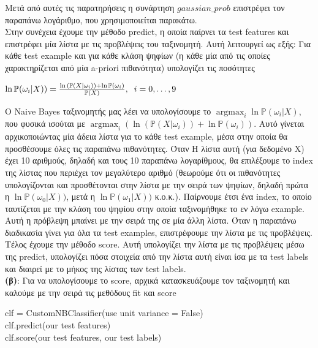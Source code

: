\documentclass[11pt]{article} %
\begin{document}
Μετά από αυτές τις παρατηρήσεις η συνάρτηση $gaussian\_prob$ επιστρέφει τον παραπάνω λογάριθμο, που χρησιμοποιείται παρακάτω.\\


Στην συνέχεια έχουμε την μέθοδο predict, η οποία παίρνει τα test features και επιστρέφει μία λίστα με τις προβλέψεις του ταξινομητή. Αυτή λειτουργεί ως εξής: Για κάθε test example και για κάθε κλάση ψηφίων (η κάθε μία από τις οποίες χαρακτηρίζεται από μία a-priori πιθανότητα) υπολογίζει τις ποσότητες\\
\begin{center}
$\ln{\mathbb{P}(\omega_{i}|X))} = \frac{\ln{(\mathbb{P}(X|\omega_{i})) + \ln{\mathbb{P}(\omega_{i})}}}{\mathbb{P}(X)}, \hspace{0.2cm} i = 0, \dots , 9$
\end{center}

O Naive Bayes ταξινομητής μας λέει να υπολογίσουμε το $\displaystyle \operatorname*{argmax}_{i} \ln{\mathbb{P}(\omega_{i}|X)}$, που φυσικά ισούται με  $\displaystyle \operatorname*{argmax}_{i} (\ln{(\mathbb{P}(X|\omega_{i})) + \ln{\mathbb{P}(\omega_{i})}}) $. Αυτό γίνεται αρχικοποιώντας μία άδεια λίστα για το κάθε test example, μέσα στην οποία θα προσθέσουμε όλες τις παραπάνω πιθανότητες. Όταν Η λίστα αυτή (για δεδομένο Χ) έχει 10 αριθμούς, δηλαδή και τους 10 παραπάνω λογαρίθμους, θα επιλέξουμε το index της λίστας που περιέχει τον μεγαλύτερο αριθμό (θεωρούμε ότι οι πιθανότητες υπολογίζονται και προσθέτονται στην λίστα με την σειρά των ψηφίων, δηλαδή πρώτα η $\ln{\mathbb{P}(\omega_{0}|X))}$, μετά η $\ln{\mathbb{P}(\omega_{1}|X))}$ κ.ο.κ.). Παίρνουμε έτσι ένα index, το οποίο ταυτίζεται με την κλάση του ψηφίου στην οποία ταξινομήθηκε το εν λόγω example. Αυτή η πρόβλεψη μπαίνει με την σειρά της σε μία άλλη λίστα. Όταν η παραπάνω διαδικασία γίνει για όλα τα test examples, επιστρέφουμε την λίστα με τις προβλέψεις.\\

Τέλος έχουμε την μέθοδο score. Αυτή υπολογίζει την λίστα με τις προβλέψεις μέσω της predict, υπολογίζει πόσα στοιχεία από την λίστα αυτή είναι ίσα με τα test labels και διαιρεί με το μήκος της λίστας των test labels.\\

\textbf{(β)}: Για να υπολογίσουμε το score, αρχικά κατασκευάζουμε τον ταξινομητή και καλούμε με την σειρά τις μεθόδους fit και score 

\begin{center}
clf = CustomNBClassifier(use unit variance = False)\\
clf.predict(our test features)\\
clf.score(our test features, our test labels)\\
\end{center}
\end{document}
